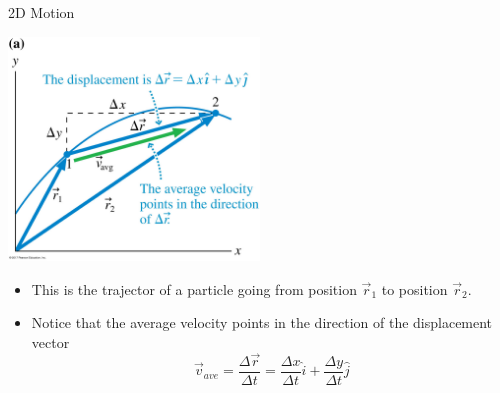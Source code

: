 \documentclass{beamer}
\begin{document}
\begin{frame}{2D Motion}
\begin{center}
   \includegraphics[width=0.5\textwidth]{../figures/04_02_FigureA.jpg}
\end{center}
\begin{itemize}
   \item This is the trajector of a particle going from position $\vec{r}_1$ to position $\vec{r}_2$.
   \item Notice that the average velocity points in the direction of the displacement vector
   \begin{equation*}
      \vec{v}_{ave} = \frac{\Delta \vec{r}}{\Delta t} = \frac{\Delta x}{\Delta t}\hat{i} + \frac{\Delta y}{\Delta t}\hat{j}
   \end{equation*}
\end{itemize}
\end{frame}
\end{document}

